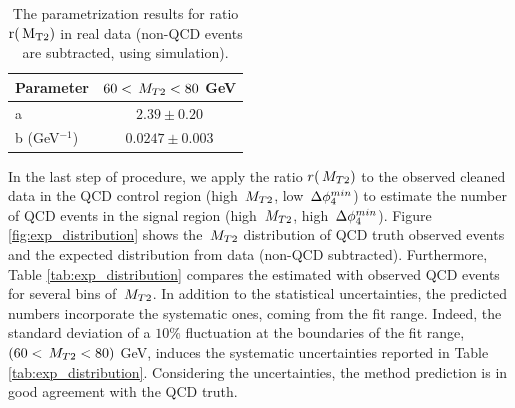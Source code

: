 \begin{linenomath}
\begin{table}[h]
\begin{center}
\small
\begin{tabular}{l|c}\hline\hline
Parameter & $60 < \,{M_{T2}} < 80$ GeV \\ \hline
a	&	$2.39\pm0.20$	\\
b (GeV$^{-1}$)	&	$0.0247\pm0.003$	\\ \hline\hline


\end{tabular}
\caption[Fit results for data]{The parametrization results for ratio $\rm{r(\ensuremath{\,{M_{T2}}})}$ 
in real data (non-QCD events are subtracted, using simulation).}
\label{tab:data_fit}
\end{center}
\end{table}
\end{linenomath}

In the last step of procedure, we apply the ratio $r(\,{M_{T2}})$ 
to the observed cleaned data in the QCD control region (high $\,{M_{T2}}$, 
low $\,{\Delta\phi_{4}^{min}}$) to estimate the number of QCD events in the signal region 
(high $\,{M_{T2}}$, high $\,{\Delta\phi_{4}^{min}}$). Figure \ref{fig:exp_distribution} shows 
the $\,{M_{T2}}$ distribution of QCD truth observed events and 
the expected distribution from data (non-QCD subtracted). 
Furthermore, Table \ref{tab:exp_distribution} compares
the estimated with observed QCD events for several bins of $\,{M_{T2}}$.
In addition to the statistical uncertainties, the predicted numbers incorporate the systematic ones, coming from
the fit range. Indeed, the standard deviation of a $10\%$ fluctuation at the boundaries of the fit range, $(60 < \,{M_{T2}} < 80)$ GeV, 
induces the systematic uncertainties reported in Table \ref{tab:exp_distribution}. 
Considering the uncertainties, the method prediction is in good agreement with the QCD truth. 
 

